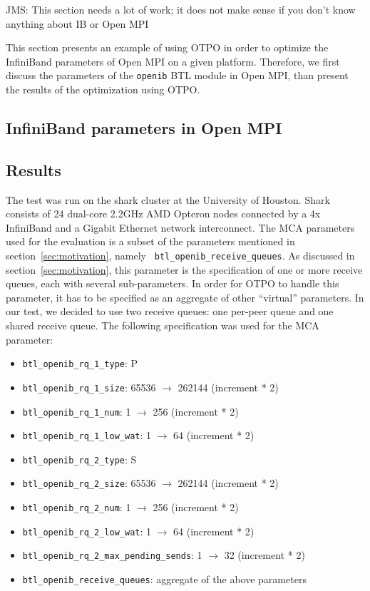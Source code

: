 {\Large JMS: This section needs a lot of work; it does not make sense if
  you don't know anything about IB or Open MPI}

This section presents an example of using OTPO in order to optimize
the InfiniBand parameters of Open MPI on a given platform. Therefore, we first discuss the parameters of the {\tt openib} BTL module in Open MPI, than present the results of the optimization using OTPO.

\subsection{InfiniBand parameters in Open MPI}


\subsection{Results}
The test was run on the shark cluster at the University of Houston. Shark
consists of 24 dual-core 2.2GHz AMD Opteron nodes connected by a 4x
InfiniBand and a Gigabit Ethernet network interconnect. 
The MCA parameters used for the evaluation is a subset of the
parameters mentioned in section~\ref{sec:motivation}, namely {\tt
  btl\_openib\_receive\_queues}. As discussed in
section~\ref{sec:motivation}, this parameter is the specification of
one or more receive queues, each with several sub-parameters.  In
order for OTPO to handle this parameter, it has to be specified as an
aggregate of other ``virtual'' parameters. In our test, we decided to
use two receive queues: one per-peer queue and one shared receive
queue. The following specification was used for the MCA parameter:

\begin{itemize}
\item {\tt btl\_openib\_rq\_1\_type}: P
\item {\tt btl\_openib\_rq\_1\_size}: 65536 $\rightarrow$ 262144
  (increment * 2)
\item {\tt btl\_openib\_rq\_1\_num}: 1 $\rightarrow$ 256 (increment *
  2)
\item {\tt btl\_openib\_rq\_1\_low\_wat}: 1 $\rightarrow$ 64
  (increment * 2)
\item {\tt btl\_openib\_rq\_2\_type}: S
\item {\tt btl\_openib\_rq\_2\_size}: 65536 $\rightarrow$ 262144
  (increment * 2)
\item {\tt btl\_openib\_rq\_2\_num}: 1 $\rightarrow$ 256 (increment *
  2)
\item {\tt btl\_openib\_rq\_2\_low\_wat}: 1 $\rightarrow$ 64
  (increment * 2)
\item {\tt btl\_openib\_rq\_2\_max\_pending\_sends}: 1 $\rightarrow$
  32 (increment * 2)
\item {\tt btl\_openib\_receive\_queues}: aggregate of the above
  parameters
\end{itemize}

